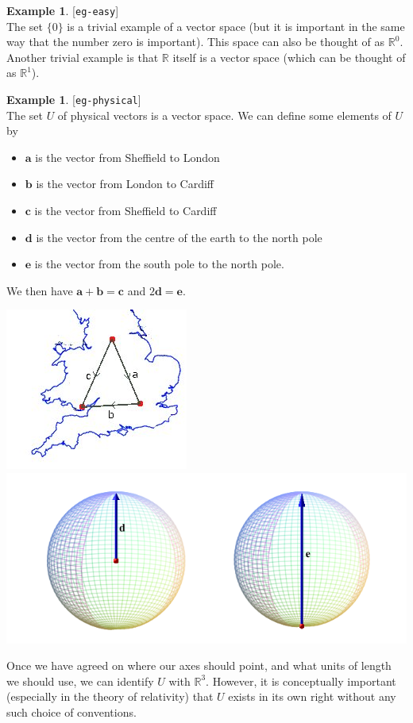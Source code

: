 \documentclass{amsart}
\newcommand{\lbl}[1]{\label{#1}\textup{[\texttt{#1}]}\ \\}
\newcommand{\lbl}{\label}
\newcommand{\R}         {{\mathbb{R}}}
\newcommand{\va}        {\mathbf{a}}
\newcommand{\vb}        {\mathbf{b}}
\newcommand{\vc}        {\mathbf{c}}
\newcommand{\vd}        {\mathbf{d}}
\newcommand{\ve}        {\mathbf{e}}
\renewcommand{\:}       {\colon}
\theoremstyle{definition}
\newtheorem{example}[theorem]{Example}
\begin{document}
\begin{example}\lbl{eg-easy}
 The set $\{0\}$ is a trivial example of a vector space (but
 it is important in the same way that the number zero is
 important).  This space can also be thought of as $\R^0$.
 Another trivial example is that $\R$ itself is a vector
 space (which can be thought of as $\R^1$).
\end{example}

\begin{example}\lbl{eg-physical}
 The set $U$ of physical vectors is a vector space.  We can
 define some elements of $U$ by
 \begin{itemize}
  \item $\va$ is the vector from Sheffield to London
  \item $\vb$ is the vector from London to Cardiff
  \item $\vc$ is the vector from Sheffield to Cardiff
  \item $\vd$ is the vector from the centre of the earth to the north
    pole
  \item $\ve$ is the vector from the south pole to the north pole.
 \end{itemize}
 We then have $\va+\vb=\vc$ and $2\vd=\ve$.
 \begin{center}
  \includegraphics[scale=0.5]{uk.jpg}
  \includegraphics[scale=0.4]{globes.png}
 \end{center}
 Once we have agreed on where our axes should point, and
 what units of length we should use, we can identify $U$
 with $\R^3$.  However, it is conceptually important
 (especially in the theory of relativity) that $U$ exists in
 its own right without any such choice of conventions.
\end{example}
\end{document}
